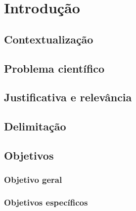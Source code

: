 \section{Introdução}
\label{cap:introducao}
\aescrever

\subsection{Contextualização}
\aescrever
\subsection{Problema científico}
\aescrever
\subsection{Justificativa e relevância}
\aescrever
\subsection{Delimitação}
\aescrever
\subsection{Objetivos}
\aescrever
\subsubsection{Objetivo geral}
\aescrever
\subsubsection{Objetivos específicos}
\aescrever
